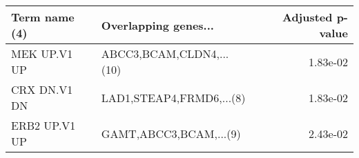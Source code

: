 \begin{tabular}{llr}
\toprule
Term name (4) &     Overlapping genes... &  Adjusted p-value \\
\midrule
 MEK UP.V1 UP & ABCC3,BCAM,CLDN4,...(10) &          1.83e-02 \\
 CRX DN.V1 DN & LAD1,STEAP4,FRMD6,...(8) &          1.83e-02 \\
ERB2 UP.V1 UP &   GAMT,ABCC3,BCAM,...(9) &          2.43e-02 \\
\bottomrule
\end{tabular}
